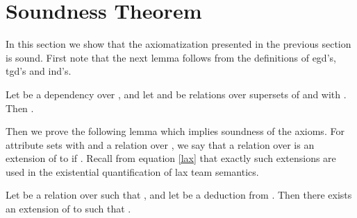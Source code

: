 \documentclass[envcountset]{llncs}
\begin{document}
\section{Soundness Theorem}
In this section we show that the axiomatization presented in the previous section is sound.  First note that the next lemma  follows from the definitions of egd's, tgd's and ind's.
\begin{lemma}\label{clear}
Let  be a dependency over , and let  and  be relations over supersets of  and with . Then .
\end{lemma}
Then we prove the following lemma  which implies soundness of the axioms. For attribute sets  with  and a relation  over , we say that a relation  over  is an extension of  to  if . Recall from equation \ref{lax} that exactly such extensions are used in the existential quantification of lax team semantics.
\begin{lemma}\label{soundlem}
Let  be a relation over  such that , and  let  be a deduction from . Then  there exists an extension  of  to  such that .
\end{lemma}
\end{document}
